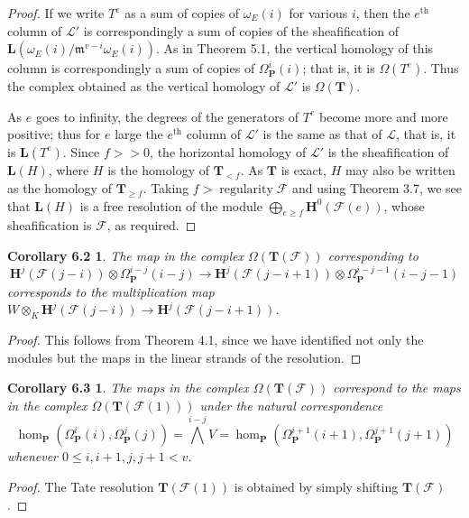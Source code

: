 \documentclass{tran-l}
\newcommand{\reg}{\operatorname{regularity}}
\newcommand{\myth}{{\operatorname{th}}}
\newcommand{\F}{\mathcal{F}}
\newcommand{\myH}{\mathbf{H}}
\newcommand{\LL}{\mathbf{L}}
\newcommand{\myP}{\mathbf{P}}
\newcommand{\TT}{\mathbf{T}}
\newcommand{\gm}{{\mathfrak{m}}}
\theoremstyle{plain}
\newtheorem*{theorem26}{Corollary 6.2}
\newtheorem*{theorem27}{Corollary 6.3}
\theoremstyle{remark}
\theoremstyle{definition}
\begin{document}
\begin{proof}
If we write
$T^{e}$ as a sum of copies of $\omega _{E}(i)$ for various $i$,
then the $e^{\myth }$ column of $\mathcal{L}'$ is correspondingly a sum of
copies of the sheafification of
$\LL (\omega _{E}(i)/\gm ^{v-i}\omega _{E}(i))$. 
As in Theorem 5.1, the
vertical homology of this column is correspondingly a sum of
copies of $\Omega _{\myP }^{i}(i)$; that is, it is $\Omega (T^{e})$. Thus
the complex obtained as the vertical homology of $\mathcal{L}'$ is
$\Omega (\TT )$.

As $e$ goes to infinity, the degrees of the generators of $T^{e}$
become more and more positive; thus for $e$ large
the $e^{\myth }$  column of $\mathcal{L}'$ is the same as that of $\mathcal{L}$, that is,
it is $\LL (T^{e})$.
Since $f>>0$, the horizontal homology of $\mathcal{L}'$ is
the sheafification of $\LL (H)$, where $H$ is
the homology of $\TT _{<f}$.
As $\TT $ is exact, $H$ may also be written as the homology of
$\TT _{\geq f}$. Taking $f>\reg \F $ and using Theorem 3.7,
we see that $\LL (H)$ is a free resolution of the module
$\bigoplus _{e\geq f}\myH ^{0}(\F (e))$, whose sheafification is $\F $,
as required.\end{proof}


\begin{theorem26}
The map in
the complex $\Omega (\TT (\F ))$ corresponding to
\begin{equation*}\myH ^{j}(\F (j-i))\otimes \Omega _{\myP
}^{i-j}(i-j)\longrightarrow \myH ^{j}(\F (j-i+1))\otimes \Omega _{\myP
}^{i-j-1}(i-j-1)
\end{equation*}
corresponds to the multiplication map
$W\otimes _{K} \myH ^{j}(\F (j-i))\longrightarrow \myH ^{j}(\F (j-i+1))$.
\end{theorem26}
\begin{proof}  This follows from Theorem 4.1, since we have identified
not only the modules but the maps in the linear strands of the
resolution.
\end{proof}
\begin{theorem27}
The maps in the complex
$\Omega (\TT (\F ))$ correspond to the maps in the complex
$\Omega (\TT (\F (1)))$ under the natural correspondence
\begin{equation*}\hom _{\myP }(\Omega _{\myP }^{i}(i), 
\Omega _{\myP }^{j}(j))=\textstyle{\bigwedge ^{i-j}}V
=\hom _{\myP }(\Omega _{\myP }^{i+1}(i+1), \Omega _{\myP }^{j+1}(j+1))
\end{equation*}
whenever $0\leq i, i+1, j, j+1 <v$.
\end{theorem27}
\begin{proof}  The Tate resolution $\TT (\F (1))$ is obtained by simply
shifting $\TT (\F )$.\end{proof}
\end{document}
